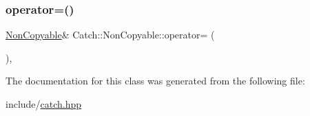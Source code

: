 \mbox{\label{class_catch_1_1_non_copyable_a317697b6d3c4cda093666ce61d3a1e31}} 
\subsubsection{\texorpdfstring{operator=()}{operator=()}\hspace{0.1cm}{\footnotesize\ttfamily [2/2]}}
{\footnotesize\ttfamily \mbox{\hyperlink{class_catch_1_1_non_copyable}{Non\+Copyable}}\& Catch\+::\+Non\+Copyable\+::operator= (\begin{DoxyParamCaption}\item[{\mbox{\hyperlink{class_catch_1_1_non_copyable}{Non\+Copyable}} \&\&}]{ }\end{DoxyParamCaption})\hspace{0.3cm}{\ttfamily [private]}, {\ttfamily [delete]}}



The documentation for this class was generated from the following file\+:\begin{DoxyCompactItemize}
\item 
include/\mbox{\hyperlink{catch_8hpp}{catch.\+hpp}}\end{DoxyCompactItemize}
